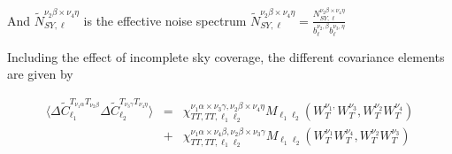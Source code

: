 \documentclass[a4paper, 11pt]{article}
\def\ba{\begin{eqnarray}}
\def\ea{\end{eqnarray}}
\begin{document}
And $\tilde{N}^{ \nu_{2} \beta \times  \nu_{4} \eta}_{SY, \ell}$ is the effective noise spectrum $ \tilde{N}^{ \nu_{2} \beta \times  \nu_{4} \eta}_{SY, \ell} = \frac{N^{ \nu_{2} \beta \times  \nu_{4} \eta}_{SY, \ell}}{ b_{\ell}^{\nu_{2}, \beta} b_{\ell}^{\nu_{3}, \eta} }$

Including the effect of incomplete sky coverage, the different covariance elements are given by

\ba
\langle \Delta \tilde{C}^{T_{\nu_{1} \alpha}T_{\nu_{2} \beta}}_{\ell_{1}} \Delta  \tilde{C}^{T_{\nu_{3} \gamma}T_{\nu_{4} \eta}}_{\ell_{2}}\rangle &=&      \chi_{TT,TT,\ell_{1}\ell_{2}}^{\nu_{1} \alpha \times \nu_{3} \gamma, \nu_{2} \beta \times  \nu_{4} \eta} M_{\ell_{1} \ell_{2}}(W_{T}^{\nu_{1}, } W_{T}^{\nu_{3}},W_{T}^{ \nu_{2} }W_{T}^{ \nu_{4} })\nonumber \\
& +&  \chi_{TT,TT,\ell_{1}\ell_{2}}^{\nu_{1} \alpha \times \nu_{4} \beta, \nu_{2} \beta \times  \nu_{3} \gamma}  M_{\ell_{1} \ell_{2}}(W_{T}^{\nu_{1}}W_{T}^{ \nu_{4} },W_{T}^{ \nu_{2} }W_{T}^{\nu_{3}})
\ea
\end{document}
